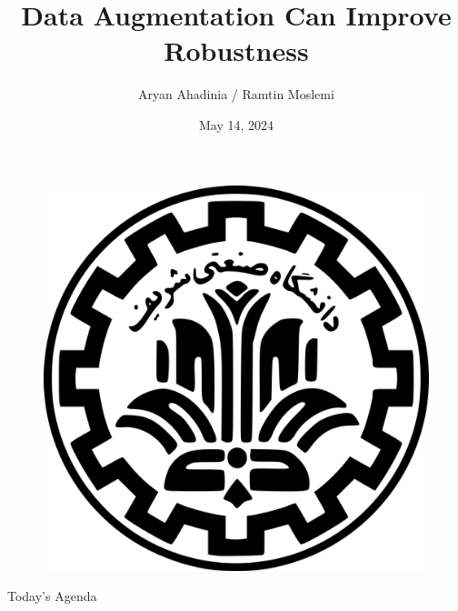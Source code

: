 \documentclass[8pt]{beamer} %
\author{Aryan Ahadinia / Ramtin Moslemi}
\title{Data Augmentation Can Improve Robustness}
\institute{Security and Privacy in Machine Learning}
\date{May 14, 2024}
\begin{document}
\begin{frame}
    \begin{figure}[htpb]
        \begin{center}
            \includegraphics[keepaspectratio, scale=0.025]{pic/sut-logo.png}
        \end{center}
    \end{figure}
    \titlepage
    \vspace*{-0.6cm}
\end{frame}

\begin{frame}{Today's Agenda}
    \tableofcontents[sectionstyle=show,
    subsectionstyle=show/shaded/hide,
    subsubsectionstyle=show/shaded/hide]
\end{frame}









% 

% 
\end{document}
